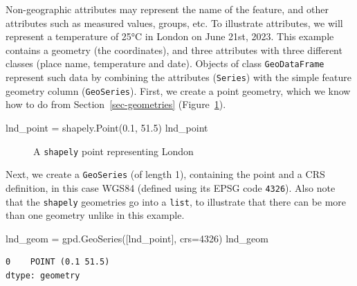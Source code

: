\documentclass[
  letterpaper,
]{krantz}
\newenvironment{Shaded}{\begin{snugshade}}{\end{snugshade}}
\newcommand{\DecValTok}[1]{\textcolor[rgb]{0.68,0.00,0.00}{#1}}
\newcommand{\FloatTok}[1]{\textcolor[rgb]{0.68,0.00,0.00}{#1}}
\newcommand{\NormalTok}[1]{\textcolor[rgb]{0.00,0.23,0.31}{#1}}
\newcommand{\OperatorTok}[1]{\textcolor[rgb]{0.37,0.37,0.37}{#1}}
\begin{document}
Non-geographic attributes may represent the name of the feature, and
other attributes such as measured values, groups, etc. To illustrate
attributes, we will represent a temperature of 25°C in London on June
21st, 2023. This example contains a geometry (the coordinates), and
three attributes with three different classes (place name, temperature
and date). Objects of class \texttt{GeoDataFrame} represent such data by
combining the attributes (\texttt{Series}) with the simple feature
geometry column (\texttt{GeoSeries}). First, we create a point geometry,
which we know how to do from Section~\ref{sec-geometries}
(Figure~\ref{fig-point-lnd}).

\begin{Shaded}
\begin{Highlighting}[]
\NormalTok{lnd\_point }\OperatorTok{=}\NormalTok{ shapely.Point(}\FloatTok{0.1}\NormalTok{, }\FloatTok{51.5}\NormalTok{)}
\NormalTok{lnd\_point}
\end{Highlighting}
\end{Shaded}

\begin{figure}[H]


\caption{\label{fig-point-lnd}A \texttt{shapely} point representing
London}

\end{figure}%

Next, we create a \texttt{GeoSeries} (of length 1), containing the point
and a CRS definition, in this case WGS84 (defined using its EPSG code
\texttt{4326}). Also note that the \texttt{shapely} geometries go into a
\texttt{list}, to illustrate that there can be more than one geometry
unlike in this example.

\begin{Shaded}
\begin{Highlighting}[]
\NormalTok{lnd\_geom }\OperatorTok{=}\NormalTok{ gpd.GeoSeries([lnd\_point], crs}\OperatorTok{=}\DecValTok{4326}\NormalTok{)}
\NormalTok{lnd\_geom}
\end{Highlighting}
\end{Shaded}

\begin{verbatim}
0    POINT (0.1 51.5)
dtype: geometry
\end{verbatim}
\end{document}
